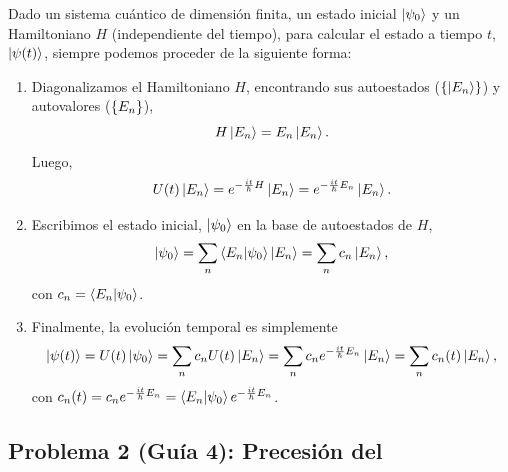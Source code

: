 \documentclass[10pt, a4paper]{article}
\numberwithin{equation}{subsection}
\begin{document}
\begin{mdframed}[style=mainframe,
  frametitle={Evolución temporal de estados [dim. finita, $H$ indep. tiempo]}]
  Dado un sistema cuántico de dimensión finita, un estado inicial
  $\ket{\psi_0}$ y un Hamiltoniano $H$ (independiente del tiempo), para
  calcular el estado a tiempo $t$, $\ket{\psi(t)}$, siempre podemos proceder de
  la siguiente forma:
  \begin{enumerate}
    \item Diagonalizamos el Hamiltoniano $H$, encontrando sus autoestados
      ($\set{\ket{E_n}}$) y autovalores ($\set{E_n}$),
      \begin{equation}
        H\ket{E_n} = E_n\ket{E_n}.
      \end{equation}
      Luego,
      \begin{equation}
        U(t)\ket{E_n} = e^{-\frac{it}{\hbar}H}\ket{E_n} =
        e^{-\frac{it}{\hbar}E_n}\ket{E_n}.
      \end{equation}
    \item Escribimos el estado inicial, $\ket{\psi_0}$ en la base de
      autoestados de $H$,
      \begin{equation}
        \ket{\psi_0} = \sum_{n}\braket{E_n}{\psi_0}\ket{E_n} =
        \sum_{n}c_n\ket{E_n},
      \end{equation}
      con $c_n = \braket{E_n}{\psi_0}$.
    \item Finalmente, la evolución temporal es simplemente
      \begin{equation}
        \ket{\psi(t)} = U(t)\ket{\psi_0} = \sum_{n}c_nU(t)\ket{E_n} =
        \sum_{n}c_ne^{-\frac{it}{\hbar}E_n}\ket{E_n} =
        \sum_{n}c_n(t)\ket{E_n},
      \end{equation}
      con $c_n(t) = c_ne^{-\frac{it}{\hbar}E_n} =
      \braket{E_n}{\psi_0}e^{-\frac{it}{\hbar}E_n}$.
  \end{enumerate}
\end{mdframed}

\subsection{Problema 2 (Guía 4): Precesión del \spin}
\end{document}
